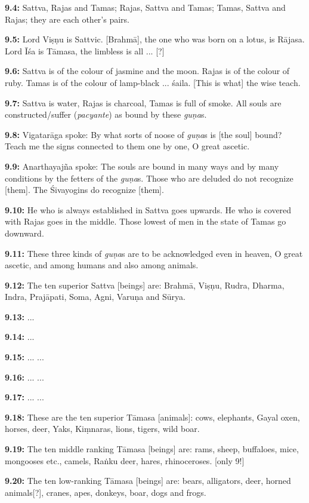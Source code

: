 \documentclass{article}
\newcommand{\vsnum}[1]{\textbf{#1}}
\newcommand{\skt}[1]{\textit{#1}}
\begin{document}
\vsnum{9.4: }Sattva, Rajas and Tamas; Rajas, Sattva and Tamas; Tamas, Sattva and Rajas; they are each other's pairs.

\vsnum{9.5: }Lord Viṣṇu is Sattvic. [Brahmā], the one who was born on a lotus, is Rājasa. Lord Īśa is Tāmasa, the limbless is all ... [?]

\vsnum{9.6: }Sattva is of the colour of jasmine and the moon. Rajas is of the colour of ruby. Tamas is of the colour of lamp-black ... śaila. [This is what] the wise teach.

\vsnum{9.7: }Sattva is water, Rajas is charcoal, Tamas is full of smoke. All souls are constructed/suffer (\skt{pacyante}) as bound by these \skt{guṇa}s.

\vsnum{9.8: }Vigatarāga spoke: By what sorts of noose of \skt{guṇa}s is [the soul] bound? Teach me the signs connected to them one by one, O great ascetic.

\vsnum{9.9: }Anarthayajña spoke: The souls are bound in many ways and by many conditions by the fetters of the \skt{guṇa}s. Those who are deluded do not recognize [them]. The Śivayogins do recognize [them].

\vsnum{9.10: }He who is always established in Sattva goes upwards. He who is covered with Rajas goes in the middle. Those lowest of men in the state of Tamas go downward.

\vsnum{9.11: }These three kinds of \skt{guṇa}s are to be acknowledged even in heaven, O great ascetic, and among humans and also among animals.

\vsnum{9.12: }The ten superior Sattva [beings] are: Brahmā, Viṣṇu, Rudra, Dharma, Indra, Prajāpati, Soma, Agni, Varuṇa and Sūrya.

\vsnum{9.13: }...

\vsnum{9.14: }...

\vsnum{9.15: }... ...

\vsnum{9.16: }... ...

\vsnum{9.17: }... ...

\vsnum{9.18: }These are the ten superior Tāmasa [animals]: cows, elephants, Gayal oxen, horses, deer, Yaks, Kiṃnaras, lions, tigers, wild boar.

\vsnum{9.19: }The ten middle ranking Tāmasa [beings] are: rams, sheep, buffaloes, mice, mongooses etc., camels, Raṅku deer, hares, rhinoceroses. [only 9!]

\vsnum{9.20: }The ten low-ranking Tāmasa [beings] are: bears, alligators, deer, horned animals[?], cranes, apes, donkeys, boar, dogs and frogs.
\end{document}
